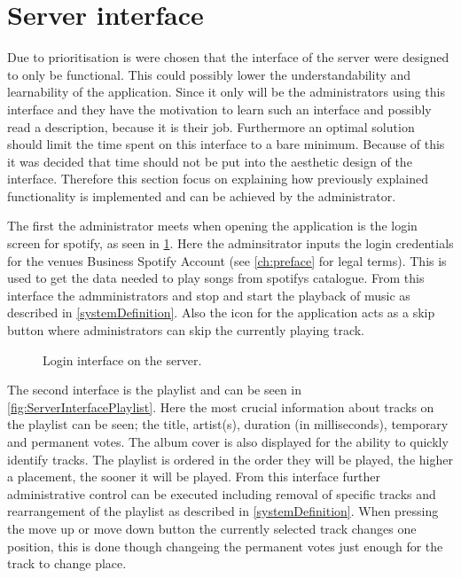 \section{Server interface}
Due to prioritisation is were chosen that the interface of the server were designed to only be functional. This could possibly lower the understandability and learnability of the application. Since it only will be the administrators using this interface and they have the motivation to learn such an interface and possibly read a description, because it is their job. Furthermore an optimal solution should limit the time spent on this interface to a bare minimum. Because of this it was decided that time should not be put into the aesthetic design of the interface. Therefore this section focus on explaining how previously explained functionality is implemented and can be achieved by the administrator.

The first the administrator meets when opening the application is the login screen for spotify, as seen in \cref{fig:loginInterface}. Here the adminsitrator inputs the login credentials for the venues Business Spotify Account (see \cref{ch:preface} for legal terms). This is used to get the data needed to play songs from spotifys catalogue. From this interface the admministrators and stop and start the playback of music as described in \cref{systemDefinition}. Also the icon for the application acts as a skip button where administrators can skip the currently playing track.

\begin{figure}[H]\label{fig:loginInterface}
  \centering
  \caption{Login interface on the server.}
\end{figure}

The second interface is the playlist and can be seen in \cref{fig:ServerInterfacePlaylist}. Here the most crucial information about tracks on the playlist can be seen; the title, artist(s), duration (in milliseconds), temporary and permanent votes. The album cover is also displayed for the ability to quickly identify tracks. The playlist is ordered in the order they will be played, the higher a placement, the sooner it will be played. From this interface further administrative control can be executed including removal of specific tracks and rearrangement of the playlist as described in \cref{systemDefinition}. When pressing the move up or move down button the currently selected track changes one position, this is done though changeing the permanent votes just enough for the track to change place.

